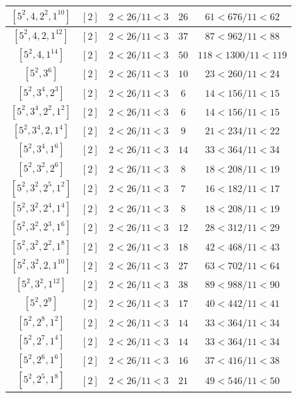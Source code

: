 \documentclass{article}%
\begin{document}
\begin{center}
\begin{longtable}{||c|c|c|c|c||}
$[5^{2}, 4, 2^{2}, 1^{10}]$ & $[2]$ & $2 < 26/11 < 3$ & $26$ & $61 < 676/11 < 62$ \\ \hline 
$[5^{2}, 4, 2, 1^{12}]$ & $[2]$ & $2 < 26/11 < 3$ & $37$ & $87 < 962/11 < 88$ \\ \hline 
$[5^{2}, 4, 1^{14}]$ & $[2]$ & $2 < 26/11 < 3$ & $50$ & $118 < 1300/11 < 119$ \\ \hline 
$[5^{2}, 3^{6}]$ & $[2]$ & $2 < 26/11 < 3$ & $10$ & $23 < 260/11 < 24$ \\ \hline 
$[5^{2}, 3^{4}, 2^{3}]$ & $[2]$ & $2 < 26/11 < 3$ & $6$ & $14 < 156/11 < 15$ \\ \hline 
$[5^{2}, 3^{4}, 2^{2}, 1^{2}]$ & $[2]$ & $2 < 26/11 < 3$ & $6$ & $14 < 156/11 < 15$ \\ \hline 
$[5^{2}, 3^{4}, 2, 1^{4}]$ & $[2]$ & $2 < 26/11 < 3$ & $9$ & $21 < 234/11 < 22$ \\ \hline 
$[5^{2}, 3^{4}, 1^{6}]$ & $[2]$ & $2 < 26/11 < 3$ & $14$ & $33 < 364/11 < 34$ \\ \hline 
$[5^{2}, 3^{2}, 2^{6}]$ & $[2]$ & $2 < 26/11 < 3$ & $8$ & $18 < 208/11 < 19$ \\ \hline 
$[5^{2}, 3^{2}, 2^{5}, 1^{2}]$ & $[2]$ & $2 < 26/11 < 3$ & $7$ & $16 < 182/11 < 17$ \\ \hline 
$[5^{2}, 3^{2}, 2^{4}, 1^{4}]$ & $[2]$ & $2 < 26/11 < 3$ & $8$ & $18 < 208/11 < 19$ \\ \hline 
$[5^{2}, 3^{2}, 2^{3}, 1^{6}]$ & $[2]$ & $2 < 26/11 < 3$ & $12$ & $28 < 312/11 < 29$ \\ \hline 
$[5^{2}, 3^{2}, 2^{2}, 1^{8}]$ & $[2]$ & $2 < 26/11 < 3$ & $18$ & $42 < 468/11 < 43$ \\ \hline 
$[5^{2}, 3^{2}, 2, 1^{10}]$ & $[2]$ & $2 < 26/11 < 3$ & $27$ & $63 < 702/11 < 64$ \\ \hline 
$[5^{2}, 3^{2}, 1^{12}]$ & $[2]$ & $2 < 26/11 < 3$ & $38$ & $89 < 988/11 < 90$ \\ \hline 
$[5^{2}, 2^{9}]$ & $[2]$ & $2 < 26/11 < 3$ & $17$ & $40 < 442/11 < 41$ \\ \hline 
$[5^{2}, 2^{8}, 1^{2}]$ & $[2]$ & $2 < 26/11 < 3$ & $14$ & $33 < 364/11 < 34$ \\ \hline 
$[5^{2}, 2^{7}, 1^{4}]$ & $[2]$ & $2 < 26/11 < 3$ & $14$ & $33 < 364/11 < 34$ \\ \hline 
$[5^{2}, 2^{6}, 1^{6}]$ & $[2]$ & $2 < 26/11 < 3$ & $16$ & $37 < 416/11 < 38$ \\ \hline 
$[5^{2}, 2^{5}, 1^{8}]$ & $[2]$ & $2 < 26/11 < 3$ & $21$ & $49 < 546/11 < 50$ \\ \hline 

\end{longtable}
\end{center}
\end{document}
